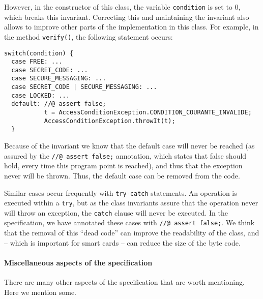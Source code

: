 \documentclass[a4paper]{llncs}
\begin{document}
However, in the constructor of this class, the variable
\texttt{condition} is set to 0, which breaks this
invariant. Correcting this and maintaining the invariant also allows
to improve other parts of the implementation in this class. For
example, in the method \texttt{verify()}, the following statement
occurs:
\begin{verbatim}
switch(condition) {
  case FREE: ...
  case SECRET_CODE: ...
  case SECURE_MESSAGING: ...
  case SECRET_CODE | SECURE_MESSAGING: ...
  case LOCKED: ...
  default: //@ assert false;
           t = AccessConditionException.CONDITION_COURANTE_INVALIDE;
           AccessConditionException.throwIt(t);
  }
\end{verbatim}
Because of the invariant we know that the default case will never
be reached (as assured by the \texttt{//@ assert false;} annotation,
which states that false should hold, every time this program point is
reached), and thus that the exception never will be thrown. Thus, the
default case can be removed from the code.

Similar cases occur frequently with \texttt{try-catch} statements. An
operation is executed within a \texttt{try}, but as the class invariants
assure that the operation never will throw an exception, the
\texttt{catch} clause will never be executed. In the specification, we 
have annotated these cases with \texttt{//@ assert false;}. We think
that the removal of this ``dead code'' can improve the readability of
the class, and -- which is important for smart cards -- can reduce the 
size of the byte code.


\paragraph{Miscellaneous aspects of the specification}
There are many other aspects of the specification that are worth
mentioning. Here we mention some.
\end{document}
